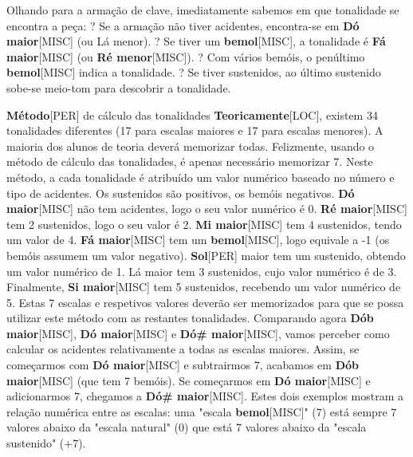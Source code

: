 \documentclass[a4paper,12pt]{article}
\begin{document}
Olhando para a armação de clave, imediatamente sabemos em que tonalidade se encontra a peça: ? Se a armação não tiver acidentes, encontra-se em \textbf{Dó maior}\textsc{[MISC]} (ou Lá menor). ? Se tiver um \textbf{bemol}\textsc{[MISC]}, a tonalidade é \textbf{Fá maior}\textsc{[MISC]} (ou \textbf{Ré menor}\textsc{[MISC]}). ? Com vários bemóis, o penúltimo \textbf{bemol}\textsc{[MISC]} indica a tonalidade. ? Se tiver sustenidos, ao último sustenido sobe-se meio-tom para descobrir a tonalidade.

\textbf{Método}\textsc{[PER]} de cálculo das tonalidades \textbf{Teoricamente}\textsc{[LOC]}, existem 34 tonalidades diferentes (17 para escalas maiores e 17 para escalas menores). A maioria dos alunos de teoria deverá memorizar todas. Felizmente, usando o método de cálculo das tonalidades, é apenas necessário memorizar 7. Neste método, a cada tonalidade é atribuído um valor numérico baseado no número e tipo de acidentes. Os sustenidos são positivos, os bemóis negativos. \textbf{Dó maior}\textsc{[MISC]} não tem acidentes, logo o seu valor numérico é 0. \textbf{Ré maior}\textsc{[MISC]} tem 2 sustenidos, logo o seu valor é 2. \textbf{Mi maior}\textsc{[MISC]} tem 4 sustenidos, tendo um valor de 4. \textbf{Fá maior}\textsc{[MISC]} tem um \textbf{bemol}\textsc{[MISC]}, logo equivale a -1 (os bemóis assumem um valor negativo). \textbf{Sol}\textsc{[PER]} maior tem um sustenido, obtendo um valor numérico de 1. Lá maior tem 3 sustenidos, cujo valor numérico é de 3. Finalmente, \textbf{Si maior}\textsc{[MISC]} tem 5 sustenidos, recebendo um valor numérico de 5. Estas 7 escalas e respetivos valores deverão ser memorizados para que se possa utilizar este método com as restantes tonalidades. Comparando agora \textbf{Dób maior}\textsc{[MISC]}, \textbf{Dó maior}\textsc{[MISC]} e \textbf{Dó\# maior}\textsc{[MISC]}, vamos perceber como calcular os acidentes relativamente a todas as escalas maiores. Assim, se começarmos com \textbf{Dó maior}\textsc{[MISC]} e subtrairmos 7, acabamos em \textbf{Dób maior}\textsc{[MISC]} (que tem 7 bemóis). Se começarmos em \textbf{Dó maior}\textsc{[MISC]} e adicionarmos 7, chegamos a \textbf{Dó\# maior}\textsc{[MISC]}. Estes dois exemplos mostram a relação numérica entre as escalas: uma "escala \textbf{bemol}\textsc{[MISC]}" (7) está sempre 7 valores abaixo da "escala natural" (0) que está 7 valores abaixo da "escala sustenido" (+7).
\end{document}
